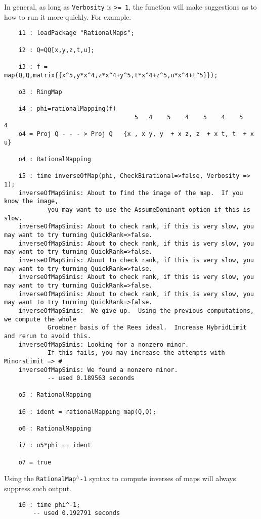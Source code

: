 \documentclass[11pt]{amsart}%
\numberwithin{equation}{theorem}
\renewcommand{\:}{\colon}
\theoremstyle{theorem}
\begin{document}
 In general, as long as {\tt Verbosity} is {\tt >= 1}, the function will make suggestions as to how to run it more quickly.  For example.  
{
{\scriptsize\color{blue}
\begin{verbatim}
    i1 : loadPackage "RationalMaps";

    i2 : Q=QQ[x,y,z,t,u];

    i3 : f = map(Q,Q,matrix{{x^5,y*x^4,z*x^4+y^5,t*x^4+z^5,u*x^4+t^5}});

    o3 : RingMap

    i4 : phi=rationalMapping(f)
                                    5   4    5    4    5    4    5    4
    o4 = Proj Q - - - > Proj Q   {x , x y, y  + x z, z  + x t, t  + x u}

    o4 : RationalMapping

    i5 : time inverseOfMap(phi, CheckBirational=>false, Verbosity => 1);
    inverseOfMapSimis: About to find the image of the map.  If you know the image,
            you may want to use the AssumeDominant option if this is slow.
    inverseOfMapSimis: About to check rank, if this is very slow, you may want to try turning QuickRank=>false.
    inverseOfMapSimis: About to check rank, if this is very slow, you may want to try turning QuickRank=>false.
    inverseOfMapSimis: About to check rank, if this is very slow, you may want to try turning QuickRank=>false.
    inverseOfMapSimis: About to check rank, if this is very slow, you may want to try turning QuickRank=>false.
    inverseOfMapSimis: About to check rank, if this is very slow, you may want to try turning QuickRank=>false.
    inverseOfMapSimis:  We give up.  Using the previous computations, we compute the whole
            Groebner basis of the Rees ideal.  Increase HybridLimit and rerun to avoid this.
    inverseOfMapSimis: Looking for a nonzero minor.
            If this fails, you may increase the attempts with MinorsLimit => #
    inverseOfMapSimis: We found a nonzero minor.
            -- used 0.189563 seconds                                                                     

    o5 : RationalMapping

    i6 : ident = rationalMapping map(Q,Q);

    o6 : RationalMapping

    i7 : o5*phi == ident

    o7 = true
\end{verbatim}
}
Using the {\tt RationalMap{{${}^\wedge$}}-1} syntax to compute inverses of maps will always suppress such output.
{\scriptsize\color{blue}
\begin{verbatim}
    i6 : time phi^-1;
        -- used 0.192791 seconds                                                                     


\end{verbatim}}}
\end{document}
